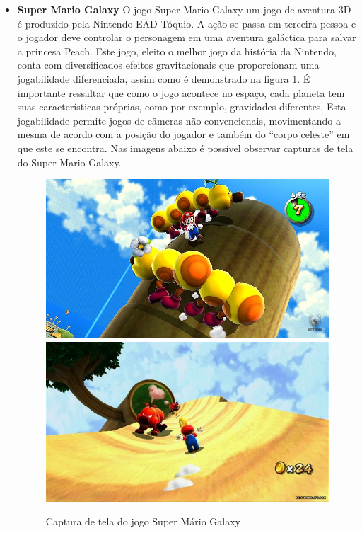 \begin{itemize}
\item {\bf Super Mario Galaxy}
O jogo Super Mario Galaxy 
um jogo de aventura 3D é produzido pela Nintendo EAD Tóquio. A ação se passa 
em terceira pessoa e o jogador deve controlar o personagem em uma aventura 
galáctica para salvar a princesa Peach.
Este jogo, eleito o melhor jogo da história da Nintendo, conta com diversificados 
efeitos gravitacionais que proporcionam uma jogabilidade diferenciada, assim como 
é demonstrado na figura \ref{img:mario}. É importante ressaltar que como o jogo acontece no 
espaço, cada planeta tem suas características próprias, como por exemplo, 
gravidades diferentes. 
Esta jogabilidade permite jogos de câmeras não convencionais, movimentando a
 mesma de acordo com a posição do jogador e também do ``corpo celeste'' em que
 este se encontra.
Nas imagens abaixo é possível observar capturas de tela do Super Mario Galaxy.

\begin{figure}[!ht]
 \centering
 \includegraphics[scale=0.4]{Imagens/mario1.png}
 \includegraphics[scale=0.4]{Imagens/mario2.png}
 \caption{Captura de tela do jogo Super Mário Galaxy}
 \label{img:mario}
\end{figure}


\end{itemize}
